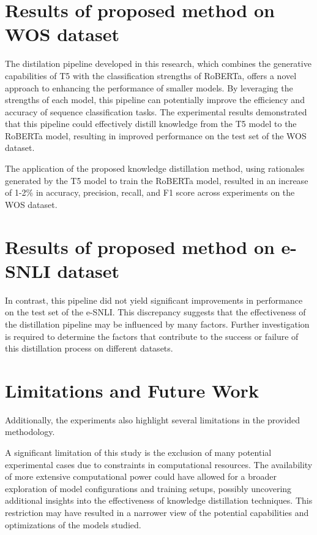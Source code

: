 \section{Results of proposed method on WOS dataset}

The distilation pipeline developed in this research, which combines the generative capabilities of T5 with the classification strengths of RoBERTa, offers a novel approach to enhancing the performance of smaller models. By leveraging the strengths of each model, this pipeline can potentially improve the efficiency and accuracy of sequence classification tasks. The experimental results demonstrated that this pipeline could effectively distill knowledge from the T5 model to the RoBERTa model, resulting in improved performance on the test set of the WOS dataset.

The application of the proposed knowledge distillation method, using rationales generated by the T5 model to train the RoBERTa model, resulted in an increase of 1-2\% in accuracy, precision, recall, and F1 score across experiments on the WOS dataset.

\section{Results of proposed method on e-SNLI dataset}

In contrast, this pipeline did not yield significant improvements in performance on the test set of the e-SNLI\@. This discrepancy suggests that the effectiveness of the distillation pipeline may be influenced by many factors. Further investigation is required to determine the factors that contribute to the success or failure of this distillation process on different datasets.

\section{Limitations and Future Work}

Additionally, the experiments also highlight several limitations in the provided methodology. 

A significant limitation of this study is the exclusion of many potential experimental cases due to constraints in computational resources. The availability of more extensive computational power could have allowed for a broader exploration of model configurations and training setups, possibly uncovering additional insights into the effectiveness of knowledge distillation techniques. This restriction may have resulted in a narrower view of the potential capabilities and optimizations of the models studied.

